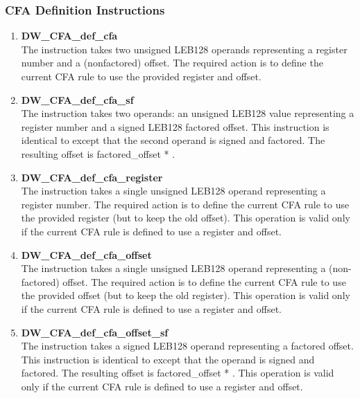 \subsubsection{CFA Definition Instructions}
\label{chap:cfadefinitioninstructions}
\begin{enumerate}[1. ]

\item \textbf{DW\_CFA\_def\_cfa} \\
The 
instruction takes two unsigned LEB128
operands representing a register number and a (non\dash factored)
offset. The required action is to define the current CFA rule
to use the provided register and offset.

\item \textbf{ DW\_CFA\_def\_cfa\_sf} \\
The  instruction takes two operands:
an unsigned LEB128 value
representing a register number and a
signed LEB128 factored offset. This instruction is identical
to  except that the second operand is signed
and factored. The resulting offset is factored\_offset *
.


\item \textbf{DW\_CFA\_def\_cfa\_register} \\
The  
instruction takes a single
unsigned LEB128 operand representing a register number. The
required action is to define the current CFA rule to use
the provided register (but to keep the old offset). This
operation is valid only if the current CFA rule is defined
to use a register and offset.



\item \textbf{DW\_CFA\_def\_cfa\_offset} \\
The  instruction takes a single
unsigned LEB128 operand representing a (non-factored)
offset. The required action is to define the current CFA rule
to use the provided offset (but to keep the old register). This
operation is valid only if the current CFA rule is defined
to use a register and offset.


\item \textbf{DW\_CFA\_def\_cfa\_offset\_sf} \\
The  instruction takes a signed
LEB128 operand representing a factored offset. This instruction
is identical to  except that the
operand is signed and factored. The resulting offset is
factored\_offset * .
This operation
is valid only if the current CFA rule is defined to use a
register and offset.


\end{enumerate}
